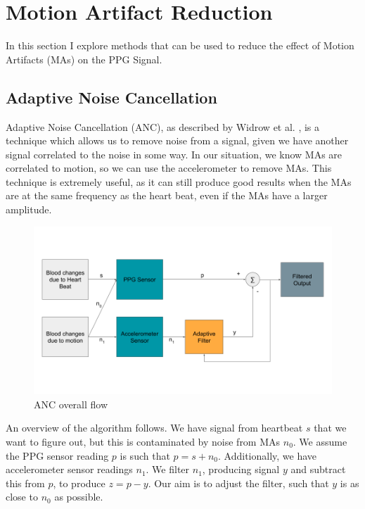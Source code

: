 \documentclass[12pt,a4paper,twoside,openright]{report}
\begin{document}
\section{Motion Artifact Reduction}

In this section I explore methods that can be used to reduce the effect of 
Motion Artifacts (MAs) on the PPG Signal.

\subsection{Adaptive Noise Cancellation}

Adaptive Noise Cancellation (ANC), as described by Widrow et al.
\cite{Widrow75}, is a technique which allows us to remove noise from a signal,
given we have another signal correlated to the noise in some way. In our 
situation, we know MAs are correlated to motion, so we can use the 
accelerometer to remove MAs. This technique is extremely useful, as it can 
still produce good results when the MAs are at the same frequency as the heart
beat, even if the MAs have a larger amplitude.



\begin{figure}[tbh]
	\centerline{\includegraphics[width=\textwidth]{figs/ANC-concept.png}}
\caption{ANC overall flow}
\label{epsfig}
\end{figure}

An overview of the algorithm follows. We have signal from heartbeat \(s\) that
we want to figure out, but this is contaminated by noise from MAs \(n_0\).
We assume the PPG sensor reading \(p\) is such that \(p=s+n_0\). Additionally,
we have accelerometer sensor readings \(n_1\). We filter \(n_1\), producing
signal \(y\) and subtract this from \(p\), to produce \(z=p-y\). Our aim is to
adjust the filter, such that \(y\) is as close to \(n_0\) as possible. 
\end{document}
